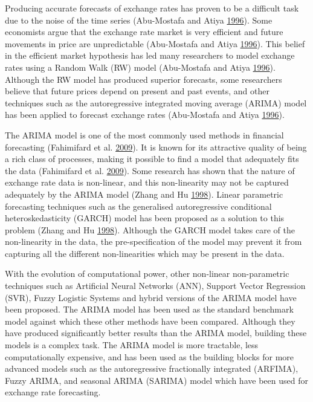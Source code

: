 \documentclass[12pt,preprint, authoryear]{elsarticle}
\numberwithin{equation}{section}
\numberwithin{figure}{section}
\numberwithin{table}{section}
\begin{document}
Producing accurate forecasts of exchange rates has proven to be a
difficult task due to the noise of the time series (Abu-Mostafa and
Atiya \protect\hyperlink{ref-abu1996}{1996}). Some economists argue that
the exchange rate market is very efficient and future movements in price
are unpredictable (Abu-Mostafa and Atiya
\protect\hyperlink{ref-abu1996}{1996}). This belief in the efficient
market hypothesis has led many researchers to model exchange rates using
a Random Walk (RW) model (Abu-Mostafa and Atiya
\protect\hyperlink{ref-abu1996}{1996}). Although the RW model has
produced superior forecasts, some researchers believe that future prices
depend on present and past events, and other techniques such as the
autoregressive integrated moving average (ARIMA) model has been applied
to forecast exchange rates (Abu-Mostafa and Atiya
\protect\hyperlink{ref-abu1996}{1996}).

The ARIMA model is one of the most commonly used methods in financial
forecasting (Fahimifard et al.
\protect\hyperlink{ref-fahimifard2009}{2009}). It is known for its
attractive quality of being a rich class of processes, making it
possible to find a model that adequately fits the data (Fahimifard et
al. \protect\hyperlink{ref-fahimifard2009}{2009}). Some research has
shown that the nature of exchange rate data is non-linear, and this
non-linearity may not be captured adequately by the ARIMA model (Zhang
and Hu \protect\hyperlink{ref-zhang1998}{1998}). Linear parametric
forecasting techniques such as the generalised autoregressive
conditional heteroskedasticity (GARCH) model has been proposed as a
solution to this problem (Zhang and Hu
\protect\hyperlink{ref-zhang1998}{1998}). Although the GARCH model takes
care of the non-linearity in the data, the pre-specification of the
model may prevent it from capturing all the different non-linearities
which may be present in the data.

With the evolution of computational power, other non-linear
non-parametric techniques such as Artificial Neural Networks (ANN),
Support Vector Regression (SVR), Fuzzy Logistic Systems and hybrid
versions of the ARIMA model have been proposed. The ARIMA model has been
used as the standard benchmark model against which these other methods
have been compared. Although they have produced significantly better
results than the ARIMA model, building these models is a complex task.
The ARIMA model is more tractable, less computationally expensive, and
has been used as the building blocks for more advanced models such as
the autoregressive fractionally integrated (ARFIMA), Fuzzy ARIMA, and
seasonal ARIMA (SARIMA) model which have been used for exchange rate
forecasting.
\end{document}
